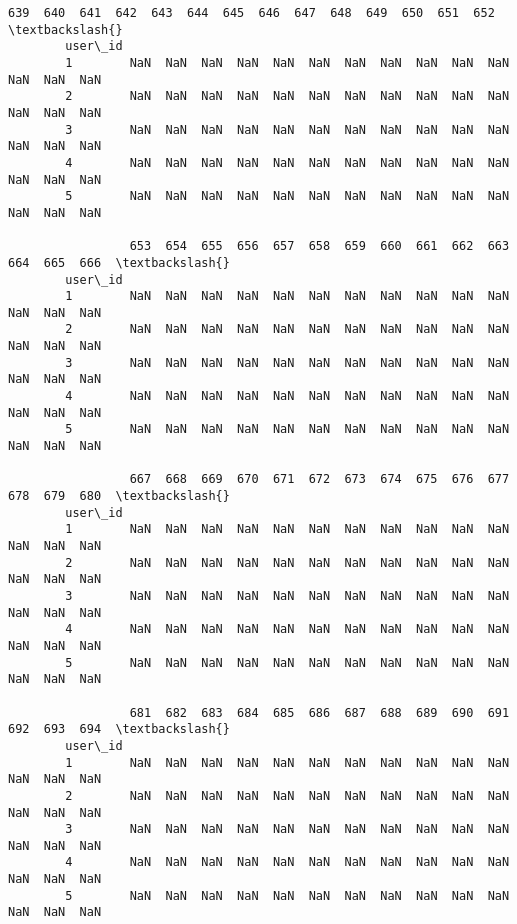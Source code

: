 \documentclass[11pt]{article}
\begin{document}
\begin{Verbatim}[commandchars=\\\{\}]
                 639  640  641  642  643  644  645  646  647  648  649  650  651  652  \textbackslash{}
        user\_id                                                                         
        1        NaN  NaN  NaN  NaN  NaN  NaN  NaN  NaN  NaN  NaN  NaN  NaN  NaN  NaN   
        2        NaN  NaN  NaN  NaN  NaN  NaN  NaN  NaN  NaN  NaN  NaN  NaN  NaN  NaN   
        3        NaN  NaN  NaN  NaN  NaN  NaN  NaN  NaN  NaN  NaN  NaN  NaN  NaN  NaN   
        4        NaN  NaN  NaN  NaN  NaN  NaN  NaN  NaN  NaN  NaN  NaN  NaN  NaN  NaN   
        5        NaN  NaN  NaN  NaN  NaN  NaN  NaN  NaN  NaN  NaN  NaN  NaN  NaN  NaN   
        
                 653  654  655  656  657  658  659  660  661  662  663  664  665  666  \textbackslash{}
        user\_id                                                                         
        1        NaN  NaN  NaN  NaN  NaN  NaN  NaN  NaN  NaN  NaN  NaN  NaN  NaN  NaN   
        2        NaN  NaN  NaN  NaN  NaN  NaN  NaN  NaN  NaN  NaN  NaN  NaN  NaN  NaN   
        3        NaN  NaN  NaN  NaN  NaN  NaN  NaN  NaN  NaN  NaN  NaN  NaN  NaN  NaN   
        4        NaN  NaN  NaN  NaN  NaN  NaN  NaN  NaN  NaN  NaN  NaN  NaN  NaN  NaN   
        5        NaN  NaN  NaN  NaN  NaN  NaN  NaN  NaN  NaN  NaN  NaN  NaN  NaN  NaN   
        
                 667  668  669  670  671  672  673  674  675  676  677  678  679  680  \textbackslash{}
        user\_id                                                                         
        1        NaN  NaN  NaN  NaN  NaN  NaN  NaN  NaN  NaN  NaN  NaN  NaN  NaN  NaN   
        2        NaN  NaN  NaN  NaN  NaN  NaN  NaN  NaN  NaN  NaN  NaN  NaN  NaN  NaN   
        3        NaN  NaN  NaN  NaN  NaN  NaN  NaN  NaN  NaN  NaN  NaN  NaN  NaN  NaN   
        4        NaN  NaN  NaN  NaN  NaN  NaN  NaN  NaN  NaN  NaN  NaN  NaN  NaN  NaN   
        5        NaN  NaN  NaN  NaN  NaN  NaN  NaN  NaN  NaN  NaN  NaN  NaN  NaN  NaN   
        
                 681  682  683  684  685  686  687  688  689  690  691  692  693  694  \textbackslash{}
        user\_id                                                                         
        1        NaN  NaN  NaN  NaN  NaN  NaN  NaN  NaN  NaN  NaN  NaN  NaN  NaN  NaN   
        2        NaN  NaN  NaN  NaN  NaN  NaN  NaN  NaN  NaN  NaN  NaN  NaN  NaN  NaN   
        3        NaN  NaN  NaN  NaN  NaN  NaN  NaN  NaN  NaN  NaN  NaN  NaN  NaN  NaN   
        4        NaN  NaN  NaN  NaN  NaN  NaN  NaN  NaN  NaN  NaN  NaN  NaN  NaN  NaN   
        5        NaN  NaN  NaN  NaN  NaN  NaN  NaN  NaN  NaN  NaN  NaN  NaN  NaN  NaN   
        

\end{Verbatim}
\end{document}
